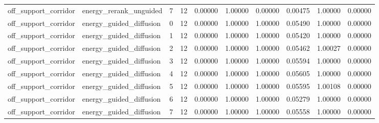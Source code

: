 \documentclass{article}
\begin{document}
\begin{table}[tbp]
{\begin{tabular}{llllllllll}
off\_support\_corridor & energy\_rerank\_unguided & 7 & 12 & 0.00000 & 1.00000 & 0.00000 & 0.00475 & 1.00000 & 0.00000 \\
off\_support\_corridor & energy\_guided\_diffusion & 0 & 12 & 0.00000 & 1.00000 & 1.00000 & 0.05490 & 1.00000 & 0.00000 \\
off\_support\_corridor & energy\_guided\_diffusion & 1 & 12 & 0.00000 & 1.00000 & 1.00000 & 0.05420 & 1.00000 & 0.00000 \\
off\_support\_corridor & energy\_guided\_diffusion & 2 & 12 & 0.00000 & 1.00000 & 1.00000 & 0.05462 & 1.00027 & 0.00000 \\
off\_support\_corridor & energy\_guided\_diffusion & 3 & 12 & 0.00000 & 1.00000 & 1.00000 & 0.05594 & 1.00000 & 0.00000 \\
off\_support\_corridor & energy\_guided\_diffusion & 4 & 12 & 0.00000 & 1.00000 & 1.00000 & 0.05605 & 1.00000 & 0.00000 \\
off\_support\_corridor & energy\_guided\_diffusion & 5 & 12 & 0.00000 & 1.00000 & 1.00000 & 0.05595 & 1.00108 & 0.00000 \\
off\_support\_corridor & energy\_guided\_diffusion & 6 & 12 & 0.00000 & 1.00000 & 1.00000 & 0.05279 & 1.00000 & 0.00000 \\
off\_support\_corridor & energy\_guided\_diffusion & 7 & 12 & 0.00000 & 1.00000 & 1.00000 & 0.05558 & 1.00000 & 0.00000 \\
\bottomrule
\end{tabular}
}
\end{table}

\clearpage
\end{document}
